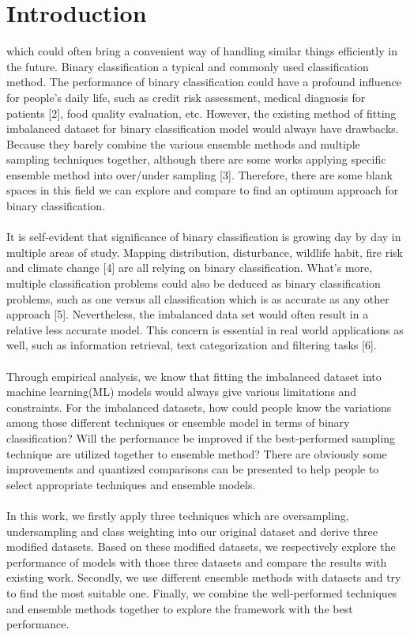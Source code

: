 \documentclass{article}
\begin{document}
\section{Introduction}
which could often bring a convenient way of handling similar things efficiently in the future. Binary classification a typical and commonly used classification method. The performance of binary classification could have a profound influence for people’s daily life, such as credit risk assessment, medical diagnosis for patients [2], food quality evaluation, etc. However, the existing method of fitting imbalanced dataset for binary classification model would always have drawbacks. Because they barely combine the various ensemble methods and multiple sampling techniques together, although there are some works applying specific ensemble method into over/under sampling [3]. Therefore, there are some blank spaces in this field we can explore and compare to find an optimum approach for binary classification.
\\\\It is self-evident that significance of binary classification is growing day by day in multiple areas of study. Mapping distribution, disturbance, wildlife habit, fire risk and climate change [4] are all relying on binary classification. What’s more, multiple classification problems could also be deduced as binary classification problems, such as one versus all classification which is as accurate as any other approach [5]. Nevertheless, the imbalanced data set would often result in a relative less accurate model. This concern is essential in real world applications as well, such as information retrieval, text categorization and filtering tasks [6].
\\\\Through empirical analysis, we know that fitting the imbalanced dataset into machine learning(ML) models would always give various limitations and constraints. For the imbalanced datasets, how could people know the variations among those different techniques or ensemble model in terms of binary classification? Will the performance be improved if the best-performed sampling technique are utilized together to ensemble method? There are obviously some improvements and quantized comparisons can be presented to help people to select appropriate techniques and ensemble models.
\\\\In this work, we firstly apply three techniques which are oversampling, undersampling and class weighting into our original dataset and derive three modified datasets. Based on these modified datasets, we respectively explore the performance of models with those three datasets and compare the results with existing work. Secondly, we use different ensemble methods with datasets and try to find the most suitable one. Finally, we combine the well-performed techniques and ensemble methods together to explore the framework with the best performance.
\end{document}
